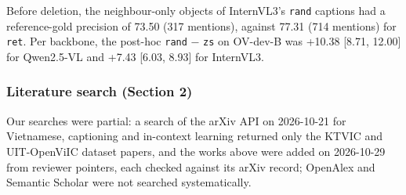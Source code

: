 \documentclass[manuscript,screen]{acmart}
\begin{document}
Before deletion, the neighbour-only objects of InternVL3's \texttt{rand} captions had a
reference-gold precision of 73.50 (317 mentions), against 77.31 (714 mentions) for \texttt{ret}. Per
backbone, the post-hoc \texttt{rand} − \texttt{zs} on OV-dev-B was +10.38 {[}8.71, 12.00{]} for
Qwen2.5-VL and +7.43 {[}6.03, 8.93{]} for InternVL3.

\subsubsection{Literature search (Section 2)}\label{literature-search-section-2}

Our searches were partial: a search of the arXiv API on 2026-10-21 for Vietnamese, captioning and
in-context learning returned only the KTVIC and UIT-OpenViIC dataset papers, and the works above
were added on 2026-10-29 from reviewer pointers, each checked against its arXiv record; OpenAlex and
Semantic Scholar were not searched systematically.


\end{document}
